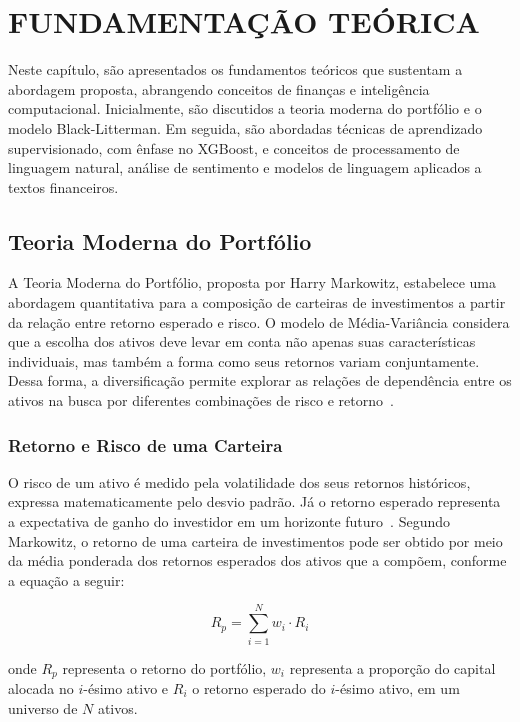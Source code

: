 \chapter{FUNDAMENTAÇÃO TEÓRICA}
\label{chapter:fundamentacao}

Neste capítulo, são apresentados os fundamentos teóricos que sustentam a abordagem proposta, abrangendo conceitos de finanças e inteligência computacional. Inicialmente, são discutidos a teoria moderna do portfólio e o modelo Black-Litterman. Em seguida, são abordadas técnicas de aprendizado supervisionado, com ênfase no XGBoost, e conceitos de processamento de linguagem natural, análise de sentimento e modelos de linguagem aplicados a textos financeiros.

\section{Teoria Moderna do Portfólio}
\label{sec:teoria_portfolio}

A Teoria Moderna do Portfólio, proposta por Harry Markowitz, estabelece uma
abordagem quantitativa para a composição de carteiras de investimentos a
partir da relação entre retorno esperado e risco. O modelo de Média-Variância
considera que a escolha dos ativos deve levar em conta não apenas suas
características individuais, mas também a forma como seus retornos variam
conjuntamente. Dessa forma, a diversificação permite explorar as relações
de dependência entre os ativos na busca por diferentes combinações de risco
e retorno~\cite{markowitz}.

\subsection{Retorno e Risco de uma Carteira}
\label{subsec:retorno_risco}

O risco de um ativo é medido pela volatilidade dos seus retornos históricos, expressa matematicamente pelo desvio padrão. Já o retorno esperado representa a expectativa de ganho do investidor em um horizonte futuro~\cite{bodie_investments_vol1}. Segundo Markowitz, o retorno de uma carteira de investimentos pode ser obtido por meio da média ponderada dos retornos esperados dos ativos que a compõem, conforme a equação a seguir:

\begin{equation}
    R_p = \sum_{i=1}^{N} w_i \cdot R_i
\end{equation}

\noindent onde $R_p$ representa o retorno do portfólio, $w_i$ representa a proporção do capital alocada no $i$-ésimo ativo e $R_i$ o retorno esperado do $i$-ésimo ativo, em um universo de $N$ ativos.

